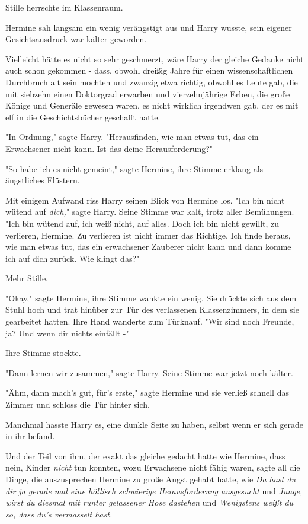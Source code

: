 {Stille herrschte im Klassenraum.

Hermine sah langsam ein wenig verängstigt aus und Harry wusste, sein eigener Gesichtsausdruck war kälter geworden.

Vielleicht hätte es nicht so sehr geschmerzt, wäre Harry der gleiche Gedanke nicht auch schon gekommen - dass, obwohl dreißig Jahre für einen wissenschaftlichen Durchbruch alt sein mochten und zwanzig etwa richtig, obwohl es Leute gab, die mit siebzehn einen Doktorgrad erwarben und vierzehnjährige Erben, die große Könige und Generäle gewesen waren, es nicht wirklich irgendwen gab, der es mit elf in die Geschichtsbücher geschafft hatte.

"In Ordnung," sagte Harry. "Herausfinden, wie man etwas tut, das ein Erwachsener nicht kann. Ist das deine Herausforderung?"

"So habe ich es nicht gemeint," sagte Hermine, ihre Stimme erklang als ängstliches Flüstern.

Mit einigem Aufwand riss Harry seinen Blick von Hermine los. "Ich bin nicht wütend auf \emph{dich,}" sagte Harry. Seine Stimme war kalt, trotz aller Bemühungen. "Ich bin wütend auf, ich weiß nicht, auf alles. Doch ich bin nicht gewillt, zu verlieren, Hermine. Zu verlieren ist nicht immer das Richtige. Ich finde heraus, wie man etwas tut, das ein erwachsener Zauberer nicht kann und dann komme ich auf dich zurück. Wie klingt das?"

Mehr Stille.

"Okay," sagte Hermine, ihre Stimme wankte ein wenig. Sie drückte sich aus dem Stuhl hoch und trat hinüber zur Tür des verlassenen Klassenzimmers, in dem sie gearbeitet hatten. Ihre Hand wanderte zum Türknauf. "Wir sind noch Freunde, ja? Und wenn dir nichts einfällt -"

Ihre Stimme stockte.

"Dann lernen wir zusammen," sagte Harry. Seine Stimme war jetzt noch kälter.

"Ähm, dann mach's gut, für's erste," sagte Hermine und sie verließ schnell das Zimmer und schloss die Tür hinter sich.

Manchmal hasste Harry es, eine dunkle Seite zu haben, selbst wenn er sich gerade in ihr befand.

Und der Teil von ihm, der exakt das gleiche gedacht hatte wie Hermine, dass nein, Kinder \emph{nicht} tun konnten, wozu Erwachsene nicht fähig waren, sagte all die Dinge, die auszusprechen Hermine zu große Angst gehabt hatte, wie \emph{Da hast du dir ja gerade mal eine höllisch schwierige Herausforderung ausgesucht} und \emph{Junge, wirst du diesmal mit runter gelassener Hose dastehen} und \emph{Wenigstens weißt du so, dass du's vermasselt hast.}

}
